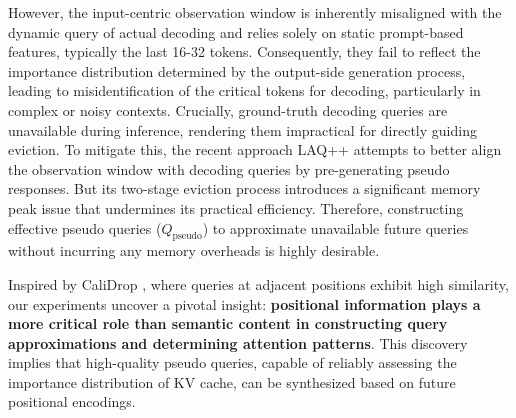 However, the input-centric observation window is inherently misaligned with the dynamic query of actual decoding and relies solely on static prompt-based features, typically the last 16-32 tokens. Consequently, they fail to reflect the importance distribution determined by the output-side generation process, leading to misidentification of the critical tokens for decoding, particularly in complex or noisy contexts. Crucially, ground-truth decoding queries are unavailable during inference, rendering them impractical for directly guiding eviction. To mitigate this, the recent approach LAQ++ \citep{lookahead} attempts to better align the observation window with decoding queries by pre-generating pseudo responses. But its two-stage eviction process introduces a significant memory peak issue that undermines its practical efficiency. Therefore, constructing effective pseudo queries (\texorpdfstring{\(Q_{\text{pseudo}}\)}{Q\_pseudo}) to approximate unavailable future queries without incurring any memory overheads is highly desirable.


Inspired by CaliDrop \citep{calidrop}, where queries at adjacent positions exhibit high similarity, our experiments uncover a pivotal insight: \textbf{positional information plays a more critical role than semantic content in constructing query approximations and determining attention patterns}. This discovery implies that high-quality pseudo queries, capable of reliably assessing the importance distribution of KV cache, can be synthesized based on future positional encodings.

